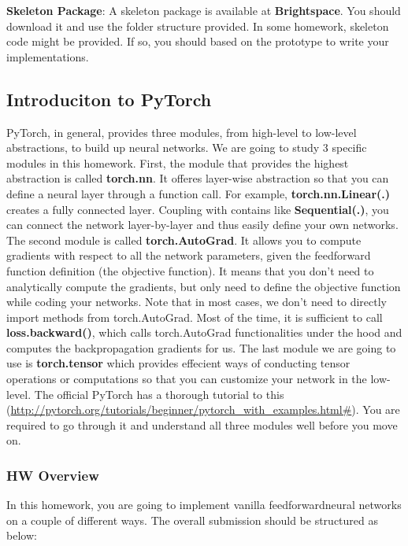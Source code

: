 \documentclass{article}
\begin{document}
\hfill

\noindent \textbf{Skeleton Package}: A skeleton package is available at \textbf{Brightspace}.
 You should download it and use the folder structure provided. In some homework, skeleton code might be provided. If so, you should based on the prototype to write your implementations.

\subsection*{Introduciton to PyTorch}

PyTorch, in general, provides three modules, from high-level to low-level abstractions, to build up neural networks. We are going to study 3 specific modules in this homework. First, the module that provides the highest abstraction is called \textbf{torch.nn}. It offeres layer-wise abstraction so that you can define a neural layer through a function call. For example, \textbf{torch.nn.Linear(.)} creates a fully connected layer. Coupling with contains like \textbf{Sequential(.)}, you can connect the network layer-by-layer and thus easily define your own networks. The second module is called \textbf{torch.AutoGrad}. It allows you to compute gradients with respect to all the network parameters, given the feedforward function definition (the objective function). It means that you don't need to analytically compute the gradients, but only need to define the objective function while coding your networks. Note that in most cases, we don't need to directly import methods from torch.AutoGrad. Most of the time, it is sufficient to call \textbf{loss.backward()}, which calls torch.AutoGrad functionalities under the hood and computes the backpropagation gradients for us. The last module we are going to use is \textbf{torch.tensor} which provides effecient ways of conducting tensor operations or computations so that you can customize your network in the low-level. The official PyTorch has a thorough tutorial to this (\url{http://pytorch.org/tutorials/beginner/pytorch_with_examples.html#}). You are required to go through it and understand all three modules well before you move on.

\subsubsection*{HW Overview}

In this homework, you are going to implement vanilla feedforwardneural networks on a couple of different ways. The overall submission should be structured as below:
\end{document}
